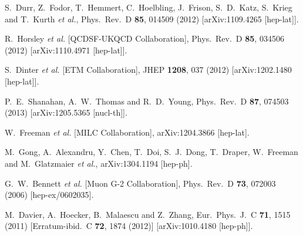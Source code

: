 \begin{thebibliography}{99}
  S.~Durr, Z.~Fodor, T.~Hemmert, C.~Hoelbling, J.~Frison, S.~D.~Katz, S.~Krieg and T.~Kurth {\it et al.},
  Phys.\ Rev.\ D {\bf 85}, 014509 (2012)
  [arXiv:1109.4265 [hep-lat]].

  R.~Horsley {\it et al.}  [QCDSF-UKQCD Collaboration],
  Phys.\ Rev.\ D {\bf 85}, 034506 (2012)
  [arXiv:1110.4971 [hep-lat]].

  S.~Dinter {\it et al.}  [ETM Collaboration],
  JHEP {\bf 1208}, 037 (2012)
  [arXiv:1202.1480 [hep-lat]].

  P.~E.~Shanahan, A.~W.~Thomas and R.~D.~Young,
  Phys.\ Rev.\ D {\bf 87}, 074503 (2013)
  [arXiv:1205.5365 [nucl-th]].

  W.~Freeman {\it et al.}  [MILC Collaboration],
  arXiv:1204.3866 [hep-lat].

  M.~Gong, A.~Alexandru, Y.~Chen, T.~Doi, S.~J.~Dong, T.~Draper, W.~Freeman and M.~Glatzmaier {\it et al.},
  arXiv:1304.1194 [hep-ph].

  G.~W.~Bennett {\it et al.}  [Muon G-2 Collaboration],
  Phys.\ Rev.\ D {\bf 73}, 072003 (2006)
  [hep-ex/0602035].

  M.~Davier, A.~Hoecker, B.~Malaescu and Z.~Zhang,
  Eur.\ Phys.\ J.\ C {\bf 71}, 1515 (2011)
  [Erratum-ibid.\ C {\bf 72}, 1874 (2012)]
  [arXiv:1010.4180 [hep-ph]].


\end{thebibliography}
